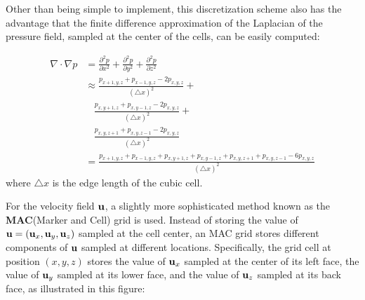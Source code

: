Other than being simple to implement, this discretization scheme also has the advantage that the finite difference approximation of the Laplacian of the pressure field, sampled at the center of the cells, can be easily computed:

\begin{equation}
    \begin{aligned}
        \nabla \cdot \nabla p 
        &= 
        \frac{\partial ^2 p}{\partial x^2}+
        \frac{\partial ^2 p}{\partial y^2}+
        \frac{\partial ^2 p}{\partial z^2} \\
        &\approx 
        \frac{p_{x+1,y,z}+p_{x-1,y,z}-2p_{x,y,z}}{(\triangle x)^2}+ \\
        &~~~~\frac{p_{x,y+1,z}+p_{x,y-1,z}-2p_{x,y,z}}{(\triangle x)^2}+ \\
        &~~~~\frac{p_{x,y,z+1}+p_{x,y,z-1}-2p_{x,y,z}}{(\triangle x)^2}\\
        &= \frac{p_{x+1,y,z}+p_{x-1,y,z}+p_{x,y+1,z}+p_{x,y-1,z}+p_{x,y,z+1}+p_{x,y,z-1}-6p_{x,y,z}}{(\triangle x)^2}
    \end{aligned}
    \label{eqn discrete laplacian pressure}
\end{equation}
where $\triangle x$ is the edge length of the cubic cell. 


For the velocity field $\textbf{u}$, a slightly more sophisticated method known as the \textbf{MAC}(Marker and Cell) grid is used. Instead of storing the value of $\textbf{u} = (\textbf{u}_x,\textbf{u}_y,\textbf{u}_z)$ sampled at the cell center, an MAC grid stores different components of $\textbf{u}$ sampled at different locations. Specifically, the grid cell at position $(x,y,z)$ stores the value of $\textbf{u}_x$ sampled at the center of its left face, the value of $\textbf{u}_y$ sampled at its lower face, and the value of $\textbf{u}_z$ sampled at its back face, as illustrated in this figure:

